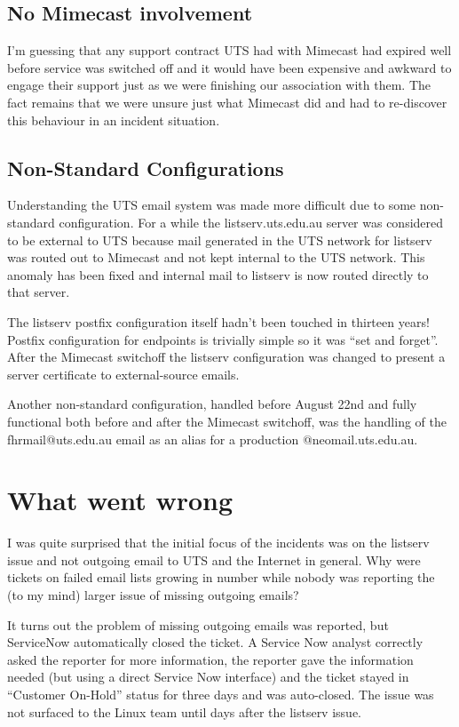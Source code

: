 \documentclass{article}
\begin{document}
\subsection{No Mimecast involvement}

I'm guessing that any support contract UTS had with Mimecast had
expired well before service was switched off and it would have been
expensive and awkward to engage their support just as we
were finishing our association with them. The fact remains that
we were unsure just what Mimecast did and had to re-discover this
behaviour in an incident situation.

\subsection{Non-Standard Configurations}

Understanding the UTS email system was made more difficult due to some
non-standard configuration. For a while the listserv.uts.edu.au server
was considered to be external to UTS because mail generated in the UTS
network for listserv was routed out to Mimecast and not kept internal
to the UTS network. This anomaly has been fixed and internal mail to
listserv is now routed directly to that server.

The listserv postfix configuration itself hadn't been touched in
thirteen years! Postfix configuration for endpoints is trivially
simple so it was ``set and forget''. After the Mimecast switchoff the
listserv configuration was changed to present a server certificate to
external-source emails.

Another non-standard configuration, handled before August 22nd and
fully functional both before and after the Mimecast switchoff, was the
handling of the fhrmail@uts.edu.au email as an alias for a
production @neomail.uts.edu.au.

\section{What went wrong}

I was quite surprised that the initial focus of the incidents was
on the listserv issue and not outgoing email to UTS and the Internet
in general. Why were tickets on failed email lists growing in number
while nobody was reporting the (to my mind) larger issue of missing
outgoing emails?

It turns out the problem of missing outgoing emails was reported, but
ServiceNow automatically closed the ticket. A Service Now analyst
correctly asked the reporter for more information, the reporter
gave the information needed (but using a direct Service Now interface)
and the ticket stayed in ``Customer On-Hold'' status for
three days and was auto-closed. The issue was not surfaced to the
Linux team until days after the listserv issue.
\end{document}
